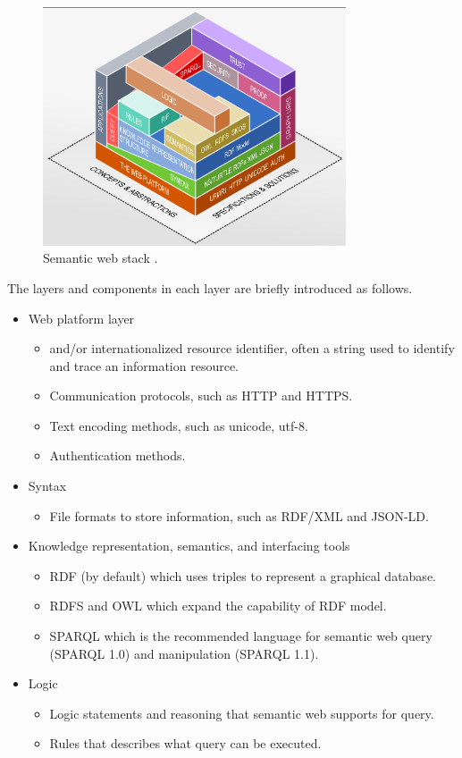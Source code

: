 \begin{figure}[htbp]
	\centering
	\includegraphics[width=0.8\textwidth]{chapters/part-4/figures/semanticwebstack.png}
	\caption{Semantic web stack \cite{semanticwebstack}.}
	\label{fig:semanticwebstack}
\end{figure}

The layers and components in each layer are briefly introduced as follows.
\begin{itemize}
	\item Web platform layer
	\begin{itemize}
		\item {} and/or internationalized resource identifier, often a string used to identify and trace an information resource.
		\item Communication protocols, such as HTTP and HTTPS.
		\item Text encoding methods, such as unicode, utf-8.
		\item Authentication methods.
	\end{itemize}
	\item Syntax
	\begin{itemize}
		\item File formats to store information, such as RDF/XML and JSON-LD.
	\end{itemize}
	\item Knowledge representation, semantics, and interfacing tools
	\begin{itemize}
		\item RDF (by default) which uses triples to represent a graphical database.
		\item RDFS and OWL which expand the capability of RDF model.
		\item SPARQL which is the recommended language for semantic web query (SPARQL 1.0) and manipulation (SPARQL 1.1).
	\end{itemize}
	\item Logic
	\begin{itemize}
		\item Logic statements and reasoning that semantic web supports for query.
		\item Rules that describes what query can be executed.
	\end{itemize}
\end{itemize}

